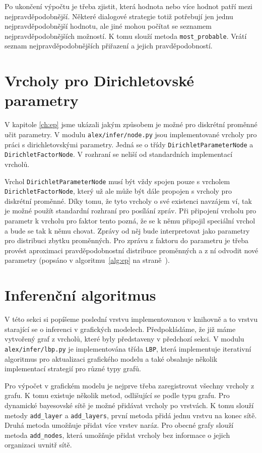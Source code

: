 Po ukončení výpočtu je třeba zjistit, která hodnota nebo více hodnot patří mezi nejpravděpodobnější.
Některé dialogové strategie totiž potřebují jen jednu nejpravděpodobnější hodnotu, ale jiné mohou počítat se seznamem nejpravděpodobnějších možností. 
K tomu slouží metoda \texttt{most\_probable}.
Vrátí seznam nejpravděpodobnějších přiřazení a jejich pravděpodobností.

\section{Vrcholy pro Dirichletovské parametry}
\label{sec:vrdir}

V kapitole \ref{ch:ep} jsme ukázali jakým způsobem je možné pro diskrétní proměnné učit parametry.
V modulu \texttt{alex/infer/node.py} jsou implementované vrcholy pro práci s dirichletovskými parametry.
Jedná se o třídy \texttt{DirichletParameterNode} a \texttt{DirichletFactorNode}.
V rozhraní se neliší od standardních implementací vrcholů.

Vrchol \texttt{DirichletParameterNode} musí být vždy spojen pouze s vrcholem \texttt{DirichletFactorNode}, který už ale může být dále propojen s vrcholy pro diskrétní proměnné.
Díky tomu, že tyto vrcholy o své existenci navzájem ví, tak je možné použít standardní rozhraní pro posílání zpráv.
Při připojení vrcholu pro parametr k vrcholu pro faktor tento pozná, že se k němu připojil speciální vrchol a bude se tak k němu chovat.
Zprávy od něj bude interpretovat jako parametry pro distribuci zbytku proměnných.
Pro zprávu z faktoru do parametru je třeba provést aproximaci pravděpodobnostní distribuce proměnných a z ní odvodit nové parametry (popsáno v algoritmu~\ref{alg:ep} na straně~\pageref{alg:ep}).

\section{Inferenční algoritmus}

V této sekci si popíšeme poslední vrstvu implementovanou v knihovně a to vrstvu starající se o inferenci v grafických modelech.
Předpokládáme, že již máme vytvořený graf z vrcholů, které byly představeny v předchozí sekci.
V modulu \texttt{alex/infer/lbp.py} je implementována třída \texttt{LBP}, která implementuje iterativní algoritmus pro aktualizaci grafického modelu a také obsahuje několik implementací strategií pro různé typy grafů.

Pro výpočet v grafickém modelu je nejprve třeba zaregistrovat všechny vrcholy z grafu.
K tomu existuje několik metod, odlišující se podle typu grafu.
Pro dynamické bayesovské sítě je možné přidávat vrcholy po vrstvách.
K tomu slouží metody \texttt{add\_layer} a \texttt{add\_layers}, první metoda přidá jednu vrstvu na konec sítě.
Druhá metoda umožňuje přidat více vrstev naráz.
Pro obecné grafy slouží metoda \texttt{add\_nodes}, která umožňuje přidat vrcholy bez informace o jejich organizaci uvnitř sítě.

